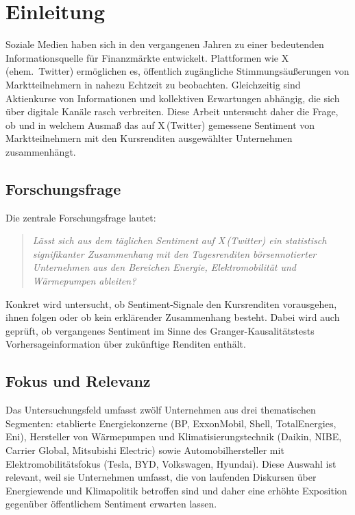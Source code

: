 \section{Einleitung}
\label{sec:einleitung}

Soziale Medien haben sich in den vergangenen Jahren zu einer bedeutenden Informationsquelle für Finanzmärkte entwickelt. Plattformen wie X\,(ehem.\ Twitter) ermöglichen es, öffentlich zugängliche Stimmungsäußerungen von Marktteilnehmern in nahezu Echtzeit zu beobachten. Gleichzeitig sind Aktienkurse von Informationen und kollektiven Erwartungen abhängig, die sich über digitale Kanäle rasch verbreiten. Diese Arbeit untersucht daher die Frage, ob und in welchem Ausmaß das auf X\,(Twitter) gemessene Sentiment von Marktteilnehmern mit den Kursrenditen ausgewählter Unternehmen zusammenhängt.

\subsection*{Forschungsfrage}

Die zentrale Forschungsfrage lautet:

\begin{quote}
\textit{Lässt sich aus dem täglichen Sentiment auf X\,(Twitter) ein statistisch signifikanter Zusammenhang mit den Tagesrenditen börsennotierter Unternehmen aus den Bereichen Energie, Elektromobilität und Wärmepumpen ableiten?}
\end{quote}

Konkret wird untersucht, ob Sentiment-Signale den Kursrenditen vorausgehen, ihnen folgen oder ob kein erklärender Zusammenhang besteht. Dabei wird auch geprüft, ob vergangenes Sentiment im Sinne des Granger-Kausalitätstests Vorhersageinformation über zukünftige Renditen enthält.

\subsection*{Fokus und Relevanz}

Das Untersuchungsfeld umfasst zwölf Unternehmen aus drei thematischen Segmenten: etablierte Energiekonzerne (BP, ExxonMobil, Shell, TotalEnergies, Eni), Hersteller von Wärmepumpen und Klimatisierungstechnik (Daikin, NIBE, Carrier Global, Mitsubishi Electric) sowie Automobilhersteller mit Elektromobilitätsfokus (Tesla, BYD, Volkswagen, Hyundai). Diese Auswahl ist relevant, weil sie Unternehmen umfasst, die von laufenden Diskursen über Energiewende und Klimapolitik betroffen sind und daher eine erhöhte Exposition gegenüber öffentlichem Sentiment erwarten lassen.

